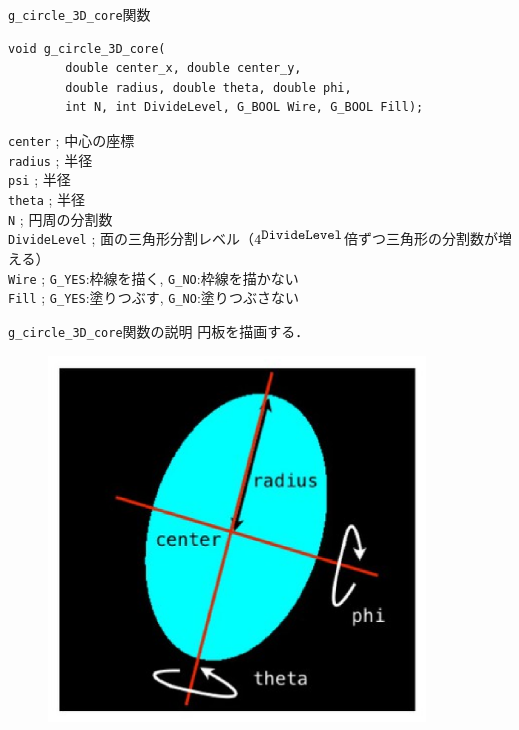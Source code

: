 \documentclass[platex,a4paper,12pt]{jsarticle}%
\begin{document}
\begin{itembox}[l]{\texttt{g\_circle\_3D\_core}関数}
\begin{verbatim}
void g_circle_3D_core(
        double center_x, double center_y,
        double radius, double theta, double phi,        
        int N, int DivideLevel, G_BOOL Wire, G_BOOL Fill);
\end{verbatim}
\verb|center| ; 中心の座標\\
\verb|radius| ; 半径\\
\verb|psi| ; 半径\\
\verb|theta| ; 半径\\
\verb|N| ; 円周の分割数 \\
\verb|DivideLevel| ; 面の三角形分割レベル（$4^{\verb|DivideLevel|}$倍ずつ三角形の分割数が増える）\\
\verb|Wire| ; \verb|G_YES|:枠線を描く, \verb|G_NO|:枠線を描かない \\
\verb|Fill| ; \verb|G_YES|:塗りつぶす, \verb|G_NO|:塗りつぶさない 
\end{itembox}

\begin{itembox}[l]{\texttt{g\_circle\_3D\_core}関数の説明}
円板を描画する．
\end{itembox}
\begin{figure}[htb]
	\includegraphics[width=100mm]{./Figures/eps/Canvas_g_circle.eps}
\end{figure}
\end{document}
